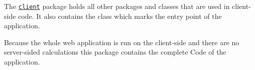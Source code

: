 The \texttt{\hyperref[pkg:edu.kit.wavelength.client]{client}} package holds all other packages and classes that are used in client-side code. 
It also contains the \texttt{} class which marks the entry point of the application.

Because the whole web application is run on the client-side and there are no server-sided calculations 
this package contains the complete Code of the application.

